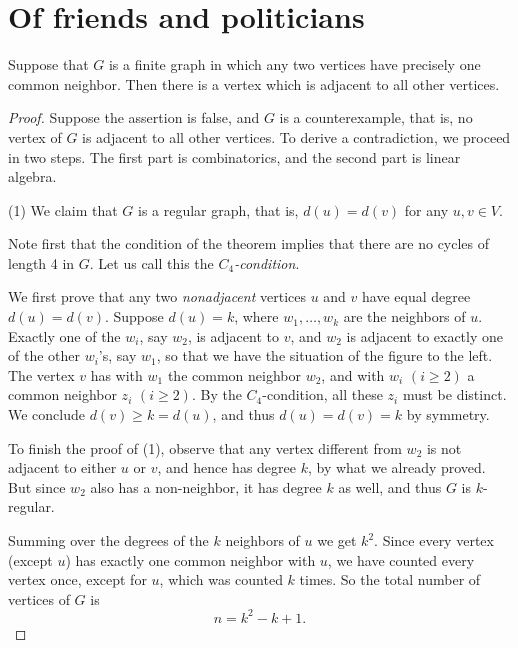 \chapter{Of friends and politicians}

\begin{theorem}
  \label{friendship}
  \leanok
  Suppose that $G$ is a finite graph in which any two vertices have precisely one common neighbor.
  Then there is a vertex which is adjacent to all other vertices.
\end{theorem}
\begin{proof}
  Suppose the assertion is false, and $G$ is a counterexample, that is, no vertex of $G$ is
  adjacent to all other vertices. To derive a contradiction,
   we proceed in two steps. The first part is combinatorics, and the second part is linear algebra.

(1) We claim that $G$ is a regular graph, that is, $d(u) = d(v)$ for any $u, v \in V$.


Note first that the condition of the theorem implies that there are no cycles of length
4 in $G$. Let us call this the \emph{$C_4$-condition}.

We first prove that any two \emph{nonadjacent} vertices $u$ and $v$ have equal degree $d(u) = d(v)$.
Suppose $d(u) = k$, where $w_1, \dots, w_k$ are the neighbors of $u$. Exactly one of the
 $w_i$, say $w_2$, is adjacent to $v$, and $w_2$ is adjacent to exactly one of the other $w_i$'s,
 say $w_1$, so that we have the situation of the figure to the left. The vertex $v$ has with $w_1$
 the common neighbor $w_2$, and with $w_i$ $(i \geq 2)$ a common neighbor $z_i$ $(i \geq 2)$.
 By the $C_4$-condition, all these $z_i$ must be distinct. We conclude $d(v) \geq k = d(u)$, and
 thus $d(u) = d(v) = k$ by symmetry.

To finish the proof of (1), observe that any vertex different from $w_2$ is not adjacent to either
 $u$ or $v$, and hence has degree $k$, by what we already proved. But since $w_2$ also has a
 non-neighbor, it has degree $k$ as well, and thus $G$ is $k$-regular.

Summing over the degrees of the $k$ neighbors of $u$ we get $k^2$. Since every vertex (except $u$)
has exactly one common neighbor with $u$, we have counted every vertex once, except for $u$,
which was counted $k$ times. So the total number of vertices of $G$ is
\[
n = k^2 - k + 1.
\]


\end{proof}
